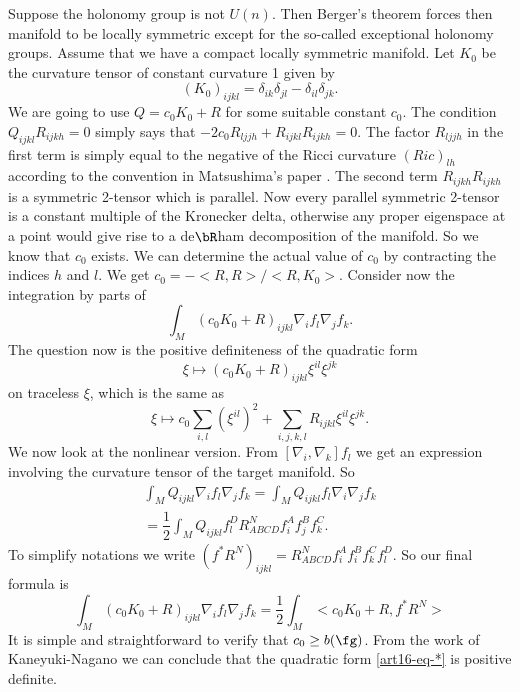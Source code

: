 Suppose the holonomy group is not $U(n)$. Then Berger's theorem forces then manifold to be locally symmetric except for the so-called exceptional holonomy groups. Assume that we have a compact locally symmetric manifold. Let $K_{0}$ be the curvature tensor of constant curvature 1 given by
$$
(K_{0})_{ijkl}=\delta_{ik}\delta_{jl}-\delta_{il}\delta_{jk}.
$$
We are going to use $Q=c_{0}K_{0} + R$ for some suitable constant $c_{0}$. The condition $Q_{ijkl}R_{ijkh}=0$ simply says that $-2 c_{0}R_{ljjh} + R_{ijkl}R_{ijkh}=0$. The factor $R_{ljjh}$ in the first term is simply equal to the negative of the Ricci curvature $(Ric)_{lh}$ according to the convention in Matsushima's paper \cite{art16-keyMat}. The second term $R_{ijkh}R_{ijkh}$ is a symmetric 2-tensor which is parallel. Now every parallel symmetric 2-tensor is a constant multiple of the Kronecker delta, otherwise any proper eigenspace at a point would give rise to a de$\bR$ham decomposition of the manifold. So we know that $c_{0}$ exists. We can determine the actual value of $c_{0}$ by contracting the indices $h$ and $l$. We get $c_{0}= -< R, R > /< R, K_{0} >$. Consider now the integration by parts of
$$
\int_{M}(c_{0}K_{0}+ R)_{ijkl}\nabla_{i}f_{l}\nabla_{j}f_{k}.
$$
The question now is the positive definiteness of the quadratic form
$$
\xi \mapsto (c_{0}K_{0} + R)_{ijkl}\xi^{il}\xi^{jk}
$$
on traceless $\xi$, which is the same as
\begin{equation}
\xi \mapsto c_{0} \sum\limits_{i,l}(\xi^{il})^{2} + \sum\limits_{i,j,k,l} R_{ijkl}\xi^{il}\xi^{jk}. \tag{$\ast$}\label{art16-eq-*}
\end{equation}
We now look at the nonlinear version. From $\left[\nabla_{i}, \nabla_{k} \right]f_{l}$ we get an expression involving the curvature tensor of the target manifold. So
\begin{gather*}
\int_{M}Q_{ijkl}\nabla_{i}f_{l} \nabla_{j}f_{k}= \int_{M}Q_{ijkl}f_{l}\nabla_{i}\nabla_{j}f_{k}\\
= \dfrac{1}{2}\int_{M}Q_{ijkl}f_{l}^{D} R_{ABCD}^{N}f_{i}^{A}f_{j}^{B}f_{k}^{C}.
\end{gather*}
To simplify notations we write $(f^{*}R^{N})_{ijkl} =R_{ABCD}^{N}f_{i}^{A}f_{i}^{B}f_{k}^{C}f_{l}^{D}$. So our final formula is
$$
\int_{M}(c_{0}K_{0} + R)_{ijkl} \nabla_{i}f_{l}\nabla_{j}f_{k} = \dfrac{1}{2}\int_{M} < c_{0}K_{0} + R, f^{*}R^{N} >
$$
It is simple and straightforward to verify that $c_{0} \geq b(\fg)$. From the work of Kaneyuki-Nagano \cite{art16-keyK-N} we can conclude that the quadratic form \eqref{art16-eq-*} is positive definite.

